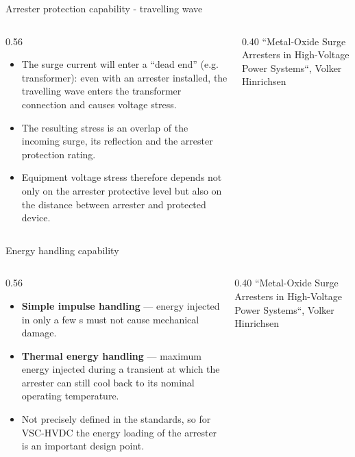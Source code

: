 \begin{frame}{Arrester protection capability - travelling wave}
  \begin{columns}[c,onlytextwidth]
    \begin{column}{0.56\textwidth}
      \begin{itemize}
        \setlength{\itemsep}{0.4em}
        \item The surge current will enter a ``dead end'' (e.g. transformer):
              even with an arrester installed, the travelling wave enters the
              transformer connection and causes voltage stress.
        \item The resulting stress is an overlap of the incoming surge, its
              reflection and the arrester protection rating.
        \item Equipment voltage stress therefore depends not only on the
              arrester protective level but also on the distance between
              arrester and protected device.
      \end{itemize}
    \end{column}
    \begin{column}{0.40\textwidth}
      \centering
      {\color{atGray}\footnotesize ``Metal-Oxide Surge Arresters in High-Voltage Power Systems``, Volker Hinrichsen}
    \end{column}
  \end{columns}
\end{frame}

\begin{frame}{Energy handling capability}
  \begin{columns}[c,onlytextwidth]
    \begin{column}{0.56\textwidth}
      \begin{itemize}
        \setlength{\itemsep}{0.4em}
        \item \textbf{Simple impulse handling} --- energy injected in only a
              few \textmu s must not cause mechanical damage.
        \item \textbf{Thermal energy handling} --- maximum energy injected
              during a transient at which the arrester can still cool back to
              its nominal operating temperature.
        \item Not precisely defined in the standards, so for VSC-HVDC the
              energy loading of the arrester is an important design point.
      \end{itemize}
    \end{column}
    \begin{column}{0.40\textwidth}
      \centering
      {\color{atGray}\footnotesize ``Metal-Oxide Surge Arresters in High-Voltage Power Systems``, Volker Hinrichsen}
    \end{column}
  \end{columns}
\end{frame}

